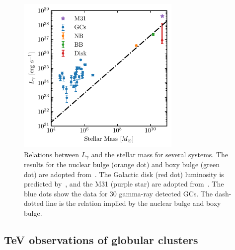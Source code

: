 \documentclass[doublespace,nopageskip]{VTthesis} %
\begin{document}
\begin{figure}[htb]
    \centering
    \includegraphics[width=0.7\textwidth]{Figures/Globular/mass.pdf}
    \caption{Relations between $L_\gamma$ and the stellar mass for several systems. The results for the nuclear bulge (orange dot) and boxy bulge (green dot) are adopted from~\citet{2019JCAP...09..042M}. The Galactic disk (red dot) luminosity is predicted by~\citet{2018NatAs...2..819B}, and the M31 (purple star) are adopted from~\citet{2017ApJ...836..208A}. The blue dots show the data for 30 gamma-ray detected GCs. The dash-dotted line is the relation implied by the nuclear bulge and boxy bulge.}
    \label{fig:stellar_mass}
\end{figure}

\subsection{TeV observations of globular clusters}
\end{document}

